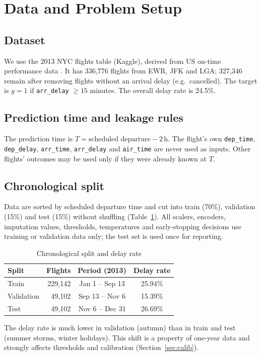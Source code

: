 \documentclass[conference]{IEEEtran}
\begin{document}
\section{Data and Problem Setup}
\subsection{Dataset}
We use the 2013 NYC flights table (Kaggle), derived from US on-time performance data \cite{bts,wick}. It has 336,776 flights from EWR, JFK and LGA; 327,346 remain after removing flights without an arrival delay (e.g.\ cancelled). The target is $y=1$ if \texttt{arr\_delay} $\ge 15$ minutes. The overall delay rate is 24.5\%.

\subsection{Prediction time and leakage rules}
The prediction time is $T=\text{scheduled departure}-2\,\text{h}$. The flight's own \texttt{dep\_time}, \texttt{dep\_delay}, \texttt{arr\_time}, \texttt{arr\_delay} and \texttt{air\_time} are never used as inputs. Other flights' outcomes may be used only if they were already known at $T$.

\subsection{Chronological split}
Data are sorted by scheduled departure time and cut into train (70\%), validation (15\%) and test (15\%) without shuffling (Table~\ref{tab:split}). All scalers, encoders, imputation values, thresholds, temperatures and early-stopping decisions use training or validation data only; the test set is used once for reporting.

\begin{table}[t]
\caption{Chronological split and delay rate}
\label{tab:split}
\centering
\small
\begin{tabular}{lrcc}
\toprule
Split & Flights & Period (2013) & Delay rate\\
\midrule
Train & 229,142 & Jan 1 -- Sep 13 & 25.94\%\\
Validation & 49,102 & Sep 13 -- Nov 6 & 15.39\%\\
Test & 49,102 & Nov 6 -- Dec 31 & 26.69\%\\
\bottomrule
\end{tabular}
\end{table}

The delay rate is much lower in validation (autumn) than in train and test (summer storms, winter holidays). This shift is a property of one-year data and strongly affects thresholds and calibration (Section~\ref{sec:calib}).
\end{document}
